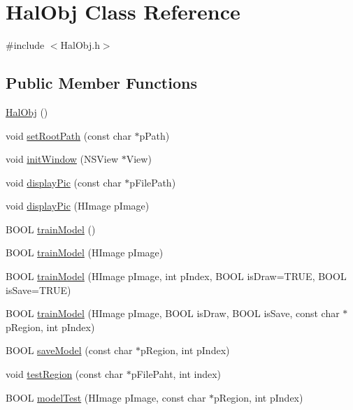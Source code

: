 \hypertarget{class_hal_obj}{}\section{Hal\+Obj Class Reference}
\label{class_hal_obj}


{\ttfamily \#include $<$Hal\+Obj.\+h$>$}

\subsection*{Public Member Functions}
\begin{DoxyCompactItemize}
\item 
\hyperlink{class_hal_obj_ae47bb3241740db20891b446b1f16cc94}{Hal\+Obj} ()
\item 
void \hyperlink{class_hal_obj_ade3d813ba067d05d7b9c02fdc4e07e4a}{set\+Root\+Path} (const char $\ast$p\+Path)
\item 
void \hyperlink{class_hal_obj_acbf14df2d2aaf1c2bc0ddd7013ed67d5}{init\+Window} (N\+S\+View $\ast$View)
\item 
void \hyperlink{class_hal_obj_ac0ed76f88a1579df532273340883dcb2}{display\+Pic} (const char $\ast$p\+File\+Path)
\item 
void \hyperlink{class_hal_obj_a464cd1c80b254af85d264f713e521a0f}{display\+Pic} (H\+Image p\+Image)
\item 
B\+O\+OL \hyperlink{class_hal_obj_ad29667e51b2d91bd0bc0e38017a73261}{train\+Model} ()
\item 
B\+O\+OL \hyperlink{class_hal_obj_abad71e786275b3b1670b6e4e67740d06}{train\+Model} (H\+Image p\+Image)
\item 
B\+O\+OL \hyperlink{class_hal_obj_a265ed09c665f1198b6baa54d08e1270f}{train\+Model} (H\+Image p\+Image, int p\+Index, B\+O\+OL is\+Draw=T\+R\+UE, B\+O\+OL is\+Save=T\+R\+UE)
\item 
B\+O\+OL \hyperlink{class_hal_obj_acbb40efcf7fbafec8c35935626554284}{train\+Model} (H\+Image p\+Image, B\+O\+OL is\+Draw, B\+O\+OL is\+Save, const char $\ast$p\+Region, int p\+Index)
\item 
B\+O\+OL \hyperlink{class_hal_obj_aba937ee414bf89f6150c8251f893d353}{save\+Model} (const char $\ast$p\+Region, int p\+Index)
\item 
void \hyperlink{class_hal_obj_ac7211fefe3dd25f7e9cd32e56d86279f}{test\+Region} (const char $\ast$p\+File\+Paht, int index)
\item 
B\+O\+OL \hyperlink{class_hal_obj_a4c6fadd4818b372c4119c6ebba434294}{model\+Test} (H\+Image p\+Image, const char $\ast$p\+Region, int p\+Index)

\end{DoxyCompactItemize}

